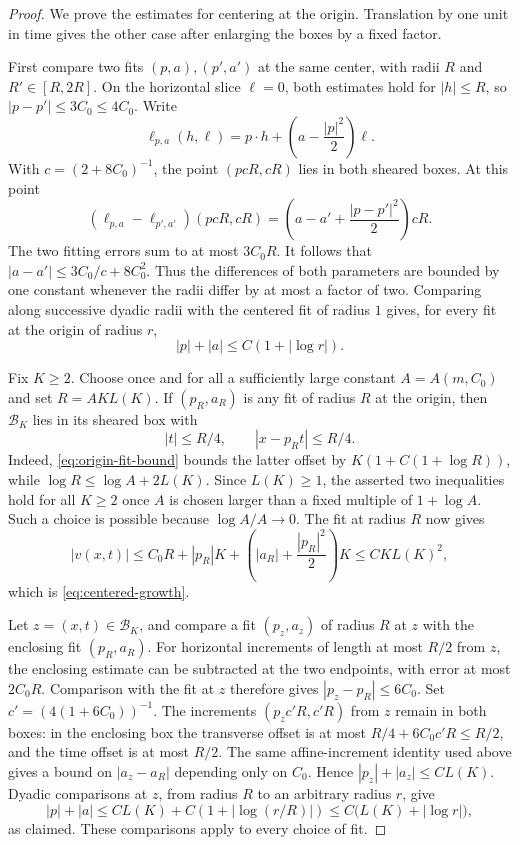 \begin{proof}
We prove the estimates for centering at the origin. Translation by
one unit in time gives the other case after enlarging the boxes by a
fixed factor.

First compare two fits $(p,a),(p',a')$ at the same center, with
radii $R$ and $R'\in[R,2R]$. On the horizontal slice $\ell=0$,
both estimates hold for $|h|\le R$, so
$|p-p'|\le 3C_0\le4C_0$. Write
\[
  \ell_{p,a}(h,\ell)=p\cdot h+
                \left(a-\frac{|p|^2}{2}\right)\ell.
\]
With $c=(2+8C_0)^{-1}$, the point $(p cR,cR)$ lies in both sheared
boxes. At this point
\[
  (\ell_{p,a}-\ell_{p',a'})(p cR,cR)
    =\left(a-a'+\frac{|p-p'|^2}{2}\right)cR.
\]
The two fitting errors sum to at most $3C_0R$. It follows that
$|a-a'|\le 3C_0/c+8C_0^2$. Thus the differences of both parameters
are bounded by one constant whenever the radii differ by at most a
factor of two. Comparing along successive dyadic radii with the
centered fit of radius $1$ gives, for every fit at the origin of
radius $r$,
\begin{equation}\label{eq:origin-fit-bound}
  |p|+|a|\le C(1+|\log r|).
\end{equation}

Fix $K\ge2$. Choose once and for all a sufficiently large constant
$A=A(m,C_0)$ and set
$R=A K L(K)$. If $(p_R,a_R)$ is any fit of radius $R$ at the
origin, then $\mathcal B_K$ lies in its sheared box with
\[
  |t|\le R/4,\qquad |x-p_Rt|\le R/4.
\]
Indeed, \eqref{eq:origin-fit-bound} bounds the latter offset by
$K(1+C(1+\log R))$, while
$\log R\le\log A+2L(K)$. Since $L(K)\ge1$, the asserted two
inequalities hold for all $K\ge2$ once $A$ is chosen larger than a
fixed multiple of $1+\log A$. Such a choice is possible because
$\log A/A\to0$. The fit at radius $R$ now gives
\[
  |v(x,t)|
  \le C_0R+|p_R|K+
      \left(|a_R|+\frac{|p_R|^2}{2}\right)K
  \le C K L(K)^2,
\]
which is \eqref{eq:centered-growth}.

Let $z=(x,t)\in\mathcal B_K$, and compare a fit $(p_z,a_z)$ of
radius $R$ at $z$ with the enclosing fit $(p_R,a_R)$. For
horizontal increments of length at most $R/2$ from $z$, the
enclosing estimate can be subtracted at the two endpoints, with
error at most $2C_0R$. Comparison with the fit at $z$ therefore
gives $|p_z-p_R|\le6C_0$. Set
$c'=(4(1+6C_0))^{-1}$. The increments
$(p_z c'R,c'R)$ from $z$ remain in both boxes: in the enclosing
box the transverse offset is at most
$R/4+6C_0c'R\le R/2$, and the time offset is at most $R/2$.
The same affine-increment identity used above gives a bound on
$|a_z-a_R|$ depending only on $C_0$. Hence
$|p_z|+|a_z|\le C L(K)$. Dyadic comparisons at $z$, from radius
$R$ to an arbitrary radius $r$, give
\[
  |p|+|a|
  \le C L(K)+C(1+|\log(r/R)|)
  \le C\bigl(L(K)+|\log r|\bigr),
\]
as claimed. These comparisons apply to every choice of fit.


\end{proof}
